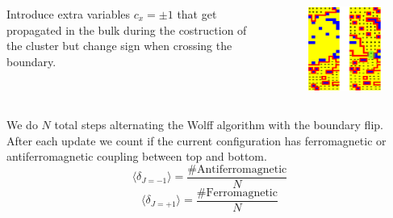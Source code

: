 \documentclass[12pt,handout]{beamer}
\begin{document}
\begin{frame}
\begin{center}

\begin{columns}
\begin{column}{0.30\textwidth}
\begin{center}
Introduce extra variables $c_{x} = \pm 1$ that get propagated in the bulk during the costruction of the cluster but change sign when crossing the boundary.
\end{center}
\end{column}
\begin{column}{0.70\textwidth}

\begin{figure}[!htb]
\centering
\includegraphics[scale=0.5]{extra.png}
\end{figure}

\end{column}
\end{columns}

\end{center}
\end{frame}

\begin{frame}
\begin{center}
We do $N$ total steps alternating the Wolff algorithm with the boundary flip.\\
\vspace{20pt}
After each update we count if the current configuration has ferromagnetic or antiferromagnetic coupling between top and bottom.\\ 
\[
\langle \delta_{J = -1} \rangle = \frac{\# \text{Antiferromagnetic}}{N}
\]
\[
\langle \delta_{J = +1} \rangle = \frac{\# \text{Ferromagnetic}}{N}
\]

\end{center}
\end{frame}
\end{document}
